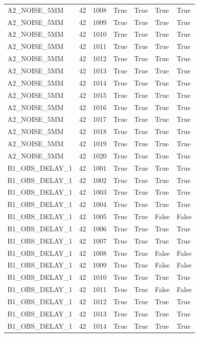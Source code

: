 \documentclass[11pt,a4paper,oneside]{book}
\begin{document}
\begin{longtable}{l l l l l l l}
A2\_NOISE\_5MM & 42 & 1008 & True & True & True & True \\
A2\_NOISE\_5MM & 42 & 1009 & True & True & True & True \\
A2\_NOISE\_5MM & 42 & 1010 & True & True & True & True \\
A2\_NOISE\_5MM & 42 & 1011 & True & True & True & True \\
A2\_NOISE\_5MM & 42 & 1012 & True & True & True & True \\
A2\_NOISE\_5MM & 42 & 1013 & True & True & True & True \\
A2\_NOISE\_5MM & 42 & 1014 & True & True & True & True \\
A2\_NOISE\_5MM & 42 & 1015 & True & True & True & True \\
A2\_NOISE\_5MM & 42 & 1016 & True & True & True & True \\
A2\_NOISE\_5MM & 42 & 1017 & True & True & True & True \\
A2\_NOISE\_5MM & 42 & 1018 & True & True & True & True \\
A2\_NOISE\_5MM & 42 & 1019 & True & True & True & True \\
A2\_NOISE\_5MM & 42 & 1020 & True & True & True & True \\
B1\_OBS\_DELAY\_1 & 42 & 1001 & True & True & True & True \\
B1\_OBS\_DELAY\_1 & 42 & 1002 & True & True & True & True \\
B1\_OBS\_DELAY\_1 & 42 & 1003 & True & True & True & True \\
B1\_OBS\_DELAY\_1 & 42 & 1004 & True & True & True & True \\
B1\_OBS\_DELAY\_1 & 42 & 1005 & True & True & False & False \\
B1\_OBS\_DELAY\_1 & 42 & 1006 & True & True & True & True \\
B1\_OBS\_DELAY\_1 & 42 & 1007 & True & True & True & True \\
B1\_OBS\_DELAY\_1 & 42 & 1008 & True & True & False & False \\
B1\_OBS\_DELAY\_1 & 42 & 1009 & True & True & False & False \\
B1\_OBS\_DELAY\_1 & 42 & 1010 & True & True & True & True \\
B1\_OBS\_DELAY\_1 & 42 & 1011 & True & True & False & False \\
B1\_OBS\_DELAY\_1 & 42 & 1012 & True & True & True & True \\
B1\_OBS\_DELAY\_1 & 42 & 1013 & True & True & True & True \\
B1\_OBS\_DELAY\_1 & 42 & 1014 & True & True & True & True \\

\end{longtable}
\end{document}
